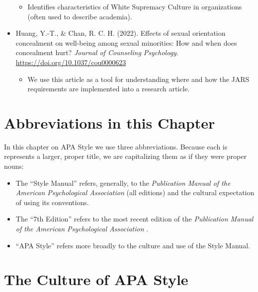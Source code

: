 \documentclass[
  11pt,
]{book}
\providecommand{\tightlist}{%
  \setlength{\itemsep}{0pt}\setlength{\parskip}{0pt}}
\begin{document}
\begin{itemize}
  \begin{itemize}
  \tightlist
  \item
    Identifies characteristics of White Supremacy Culture in organizations (often used to describe academia).
  \end{itemize}
\item
  Huang, Y.-T., \& Chan, R. C. H. (2022). Effects of sexual orientation concealment on well-being among sexual minorities: How and when does concealment hurt? \emph{Journal of Counseling Psychology}. \url{https://doi.org/10.1037/cou0000623}

  \begin{itemize}
  \tightlist
  \item
    We use this article as a tool for understanding where and how the JARS requirements are implemented into a research article.
  \end{itemize}
\end{itemize}

\hypertarget{abbreviations-in-this-chapter}{%
\section{Abbreviations in this Chapter}\label{abbreviations-in-this-chapter}}

In this chapter on APA Style we use three abbreviations. Because each is represents a larger, proper title, we are capitalizing them as if they were proper nouns:

\begin{itemize}
\tightlist
\item
  The ``Style Manual'' refers, generally, to the \emph{Publication Manual of the American Psychological Association} (all editions) and the cultural expectation of using its conventions.
\item
  The ``7th Edition'' refers to the most recent edition of the \emph{Publication Manual of the American Psychological Association} \citep{american_psychological_association_publication_2020}.
\item
  ``APA Style'' refers more broadly to the culture and use of the Style Manual.
\end{itemize}

\hypertarget{the-culture-of-apa-style}{%
\section{The Culture of APA Style}\label{the-culture-of-apa-style}}
\end{document}
